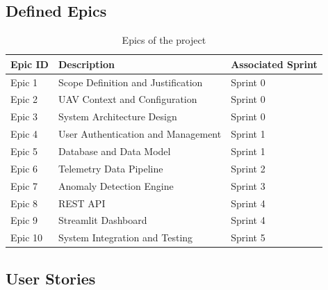 \subsection{Defined Epics}

\begin{table}[H]
\centering
\caption{Epics of the project}
\begin{tabular}{|p{2cm}|p{8cm}|p{3cm}|}
\hline
\textbf{Epic ID} & \textbf{Description} & \textbf{Associated Sprint} \\
\hline
Epic 1 & Scope Definition and Justification & Sprint 0 \\
\hline
Epic 2 & UAV Context and Configuration & Sprint 0 \\
\hline
Epic 3 & System Architecture Design & Sprint 0 \\
\hline
Epic 4 & User Authentication and Management & Sprint 1 \\
\hline
Epic 5 & Database and Data Model & Sprint 1 \\
\hline
Epic 6 & Telemetry Data Pipeline & Sprint 2 \\
\hline
Epic 7 & Anomaly Detection Engine & Sprint 3 \\
\hline
Epic 8 & REST API & Sprint 4 \\
\hline
Epic 9 & Streamlit Dashboard & Sprint 4 \\
\hline
Epic 10 & System Integration and Testing & Sprint 5 \\
\hline
\end{tabular}
\end{table}

\subsection{User Stories}


